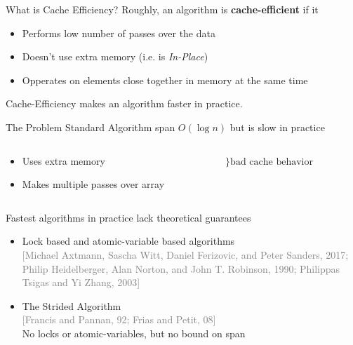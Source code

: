 \documentclass[xcolor=x11names, svgnames, rgb]{beamer}
\newcommand{\citefont}[1]{{\tiny \textcolor{Gray}{#1}}}
\begin{document}
\begin{frame}{What is Cache Efficiency?}
  Roughly, an algorithm is \textbf{cache-efficient} if it
  \begin{itemize}
    \item Performs low number of passes over the data
    \item Doesn't use extra memory (i.e. is \emph{In-Place})
    \item Opperates on elements close together in memory at the same time
  \end{itemize}
  \vspace{1.5cm}
  Cache-Efficiency makes an algorithm faster in practice.
\end{frame}

\begin{frame}[t]{The Problem}
  Standard Algorithm {\color{blue}span $O(\log n)$} but is {\color{red}slow in practice}
	\begin{columns}[T] %
	\begin{column}{.65\textwidth}
	\begin{itemize}
    \item {\color{red}Uses extra memory}
    \item {\color{red}Makes multiple passes over array}
	\end{itemize}
	\end{column}
	\begin{column}{.35\textwidth}
	\hspace{-1cm}$\Biggr\}\text{bad cache behavior}$
	\end{column}
	\end{columns}
	\vspace{0.4 cm}

  {\color{blue}Fastest algorithms in practice} {\color{red}lack theoretical guarantees}
	\begin{itemize}
  \item {\color{red}Lock based} and {\color{red}atomic-variable
    based} algorithms\\ \citefont{[Michael Axtmann, Sascha Witt, Daniel Ferizovic, and Peter Sanders, 2017; Philip Heidelberger, Alan Norton, and John T. Robinson, 1990; Philippas Tsigas and Yi Zhang, 2003]}
		\item The Strided Algorithm\\ \citefont{[Francis and Pannan, 92; Frias and Petit, 08]}\\ 
      {\color{blue}No locks or atomic-variables}, {\color{red}but no bound on span}
	\end{itemize}
	\vspace{0.2cm}
\end{frame}
\end{document}

